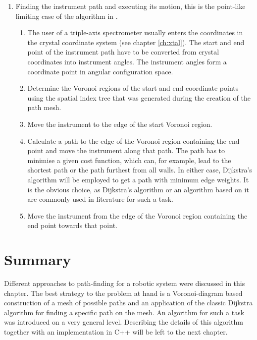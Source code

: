 \begin{enumerate}
	\item Finding the instrument path and executing its motion, this is the 
		point-like limiting case of the algorithm in \cite[p. 163]{Berg2008}.
	\begin{enumerate}
		\item The user of a triple-axis spectrometer usually enters the coordinates 
			in the crystal coordinate system (see chapter \ref{ch:xtal}). The start 
			and end point of the instrument path have to be converted from crystal
			coordinates into instrument angles. The instrument angles form a 
			coordinate point in angular configuration space.
		\item Determine the Voronoi regions of the start and end coordinate points
			using the spatial index tree that was generated during the creation
			of the path mesh.
		\item Move the instrument to the edge of the start Voronoi region.
		\item Calculate a path to the edge of the Voronoi region 
			containing the end point and move the instrument along that path. 
			The path has to minimise a given cost function, which can,
			for example, lead to the shortest path or the path furthest from
			all walls. 
			In either case, Dijkstra's algorithm \cite{wiki_dijkstra}
			will be employed to get a path with minimum edge weights.
			It is the obvious choice, as Dijkstra's algorithm or an algorithm based 
			on it are commonly used in literature \cite{Hwang2003, Singal2014} 
			for such a task.
		\item Move the instrument from the edge of the Voronoi region containing 
			the end point towards that point.
	\end{enumerate}
\end{enumerate}


\section{Summary}
Different approaches to path-finding for a robotic system were discussed in this chapter.
The best strategy to the problem at hand is a Voronoi-diagram based construction of
a mesh of possible paths and an application of the classic Dijkstra algorithm for 
finding a specific path on the mesh.
An algorithm for such a task was introduced on a very general level.
Describing the details of this algorithm together with an implementation in C++  
will be left to the next chapter.
